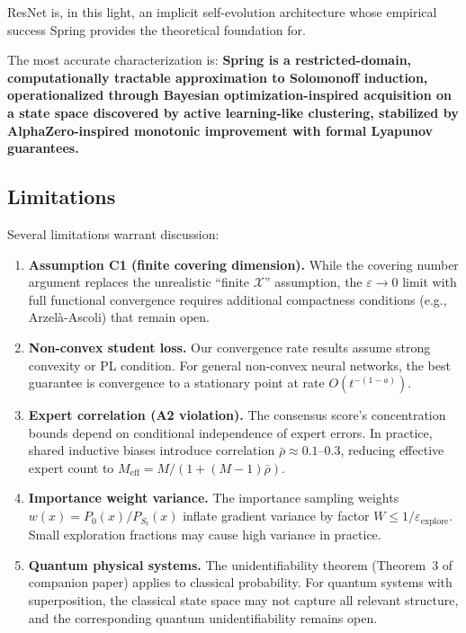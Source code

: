 \documentclass[11pt,a4paper]{article}
\theoremstyle{plain}
\theoremstyle{definition}
\theoremstyle{remark}
\newcommand{\X}{\mathcal{X}}
\begin{document}
ResNet is, in this light, an implicit self-evolution architecture whose empirical success Spring provides the theoretical foundation for.

The most accurate characterization is: \textbf{Spring is a restricted-domain, computationally tractable approximation to Solomonoff induction, operationalized through Bayesian optimization-inspired acquisition on a state space discovered by active learning-like clustering, stabilized by AlphaZero-inspired monotonic improvement with formal Lyapunov guarantees.}

\subsection{Limitations}

Several limitations warrant discussion:

\begin{enumerate}[nosep]
    \item \textbf{Assumption C1 (finite covering dimension).} While the covering number argument replaces the unrealistic ``finite $\X$'' assumption, the $\varepsilon \to 0$ limit with full functional convergence requires additional compactness conditions (e.g., Arzel\`{a}-Ascoli) that remain open.
    \item \textbf{Non-convex student loss.} Our convergence rate results assume strong convexity or PL condition. For general non-convex neural networks, the best guarantee is convergence to a stationary point at rate $O(t^{-(1-a)})$.
    \item \textbf{Expert correlation (A2 violation).} The consensus score's concentration bounds depend on conditional independence of expert errors. In practice, shared inductive biases introduce correlation $\bar{\rho} \approx 0.1$--$0.3$, reducing effective expert count to $M_{\text{eff}} = M/(1 + (M-1)\bar{\rho})$.
    \item \textbf{Importance weight variance.} The importance sampling weights $w(x) = P_0(x)/P_{S_t}(x)$ inflate gradient variance by factor $W \leq 1/\varepsilon_{\text{explore}}$. Small exploration fractions may cause high variance in practice.
    \item \textbf{Quantum physical systems.} The unidentifiability theorem (Theorem~3 of companion paper) applies to classical probability. For quantum systems with superposition, the classical state space may not capture all relevant structure, and the corresponding quantum unidentifiability remains open.
\end{enumerate}
\end{document}
